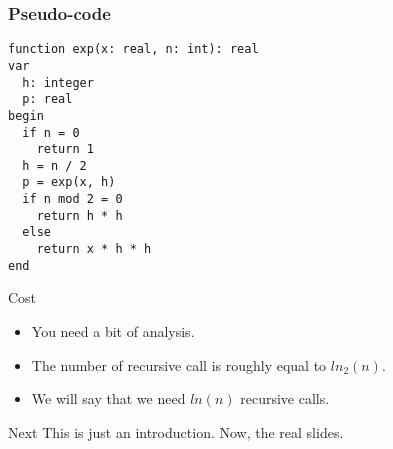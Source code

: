 \documentclass{beamer}
\begin{document}
\begin{frame}[fragile]
\frametitle{Pseudo-code}
\begin{verbatim}
function exp(x: real, n: int): real
var
  h: integer
  p: real
begin
  if n = 0
    return 1
  h = n / 2
  p = exp(x, h)
  if n mod 2 = 0
    return h * h
  else
    return x * h * h
end
\end{verbatim}
\end{frame}

\begin{frame}{Cost}
\justifying
\begin{itemize}
  \item You need a bit of analysis.
  \item The number of recursive call is roughly equal to $ln_{2}(n)$.
  \item We will say that we need $ln(n)$ recursive calls.
\end{itemize}
\end{frame}

\begin{frame}{Next}
  This is just an introduction. Now, the real slides.
\end{frame}
\end{document}

